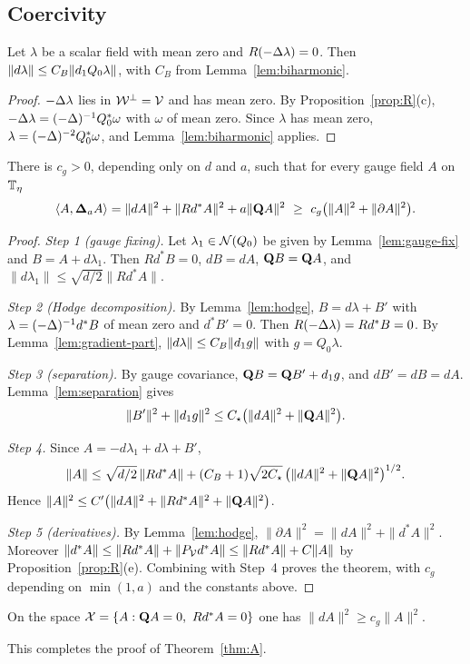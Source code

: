\subsection{Coercivity}

\begin{lemma}\label{lem:gradient-part}
Let $\lambda$ be a scalar field with mean zero and $R(-\Delta\lambda)=0$. Then $\|d\lambda\|\le C_B\|d_1 Q_0\lambda\|$, with $C_B$ from Lemma~\ref{lem:biharmonic}.
\end{lemma}

\begin{proof}
$-\Delta\lambda$ lies in $\mathcal W^\perp=\mathcal V$ and has mean zero. By Proposition~\ref{prop:R}(c), $-\Delta\lambda=(-\Delta)^{-1}Q_0^*\omega$ with $\omega$ of mean zero. Since $\lambda$ has mean zero, $\lambda=(-\Delta)^{-2}Q_0^*\omega$, and Lemma~\ref{lem:biharmonic} applies.
\end{proof}

\begin{theorem}\label{thm:gauge-coercive}
There is $c_g>0$, depending only on $d$ and $a$, such that for every gauge field $A$ on $\mathbb T_\eta$
\[
\ip A{\bL_aA}=\|dA\|^2+\|Rd^*A\|^2+a\|\bQ A\|^2\ \ge\ c_g\big(\|A\|^2+\|\partial A\|^2\big).
\]
\end{theorem}

\begin{proof}
\emph{Step 1 (gauge fixing).} Let $\lambda_1\in\mathcal N(Q_0)$ be given by Lemma~\ref{lem:gauge-fix} and $B=A+d\lambda_1$. Then $Rd^*B=0$, $dB=dA$, $\mathbf Q B=\mathbf Q A$, and $\|d\lambda_1\|\le\sqrt{d/2}\|Rd^*A\|$.

\emph{Step 2 (Hodge decomposition).} By Lemma~\ref{lem:hodge}, $B=d\lambda+B'$ with $\lambda=(-\Delta)^{-1}d^*B$ of mean zero and $d^*B'=0$. Then $R(-\Delta\lambda)=Rd^*B=0$. By Lemma~\ref{lem:gradient-part}, $\|d\lambda\|\le C_B\|d_1 g\|$ with $g=Q_0\lambda$.

\emph{Step 3 (separation).} By gauge covariance, $\mathbf Q B=\mathbf Q B'+d_1 g$, and $dB'=dB=dA$. Lemma~\ref{lem:separation} gives
\[
\|B'\|^2+\|d_1 g\|^2\le C_\star\big(\|dA\|^2+\|\mathbf Q A\|^2\big).
\]

\emph{Step 4.} Since $A=-d\lambda_1+d\lambda+B'$,
\[
\|A\|\le\sqrt{d/2}\,\|Rd^*A\|+(C_B+1)\sqrt{2C_\star}\,\big(\|dA\|^2+\|\mathbf Q A\|^2\big)^{1/2}.
\]
Hence $\|A\|^2\le C'\big(\|dA\|^2+\|Rd^*A\|^2+\|\mathbf Q A\|^2\big)$.

\emph{Step 5 (derivatives).} By Lemma~\ref{lem:hodge}, $\|\partial A\|^2=\|dA\|^2+\|d^*A\|^2$. Moreover $\|d^*A\|\le\|Rd^*A\|+\|P_\mathcal V d^*A\|\le\|Rd^*A\|+C\|A\|$ by Proposition~\ref{prop:R}(e). Combining with Step~4 proves the theorem, with $c_g$ depending on $\min(1,a)$ and the constants above.
\end{proof}

\begin{corollary}\label{cor:X-positive}
On the space $\mathcal X=\{A:\mathbf Q A=0,\ Rd^*A=0\}$ one has $\|dA\|^2\ge c_g\|A\|^2$.
\end{corollary}

This completes the proof of Theorem~\ref{thm:A}.
